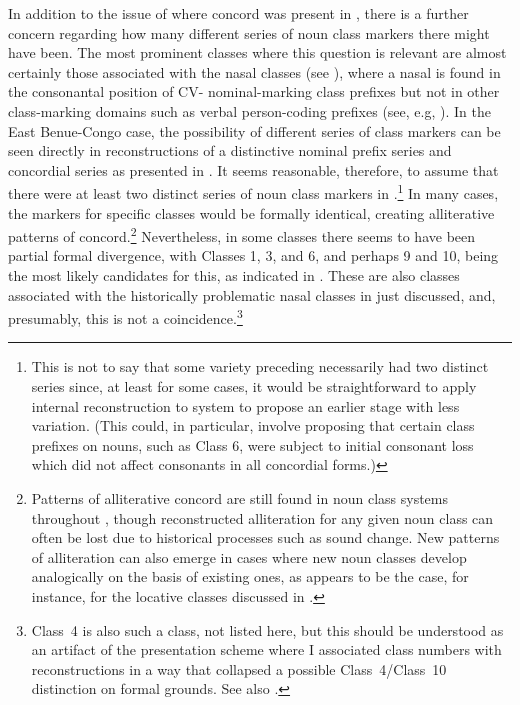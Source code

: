 \documentclass[output=paper ,collection	  ,collectionchapter ,biblatexbackend=biber   ]{langscibook}
\begin{document}
In addition to the issue of where concord was present in ,
there is a further concern regarding how many different series of noun class
markers there might have been. The most prominent classes where this question is
relevant are almost certainly those associated with the  nasal classes (see
), where a nasal is found in the consonantal position of CV-
nominal-marking class prefixes but not in other class-marking domains such as
verbal person-coding prefixes (see, e.g, ). In
the {East Benue-Con\-go} case, the possibility of different series of class
markers can be seen directly in  reconstructions of a
distinctive nominal prefix series and concordial series as presented in
. It seems reasonable, therefore, to assume that there were at
least two distinct series of noun class markers in
.\footnote{This 
  is not to say that some variety preceding
   necessarily had two distinct series since, at least for some
  cases, it would be straightforward to apply internal reconstruction to
    system to propose an earlier stage
  with less variation. (This could, in particular, involve proposing that certain
  class prefixes on nouns, such as Class 6, were subject to initial consonant loss
  which did not affect consonants in all concordial forms.)
  } In many cases, the
markers for specific classes would be formally identical, creating alliterative
patterns of concord.{\footnote{Patterns of alliterative concord are still found
in noun class systems throughout , though reconstructed
alliteration for any given noun class can often be lost due to historical
processes such as sound change. New patterns of alliteration can also emerge in
cases where new noun classes develop analogically on the basis of existing ones,
as appears to be the case, for instance, for the  locative classes
discussed in .}} Nevertheless, in some classes there seems to have
been partial formal divergence, with Classes 1, 3, and 6, and perhaps 9 and 10,
being the most likely candidates for this, as indicated in .
These are also classes associated with the historically problematic nasal
classes in  just discussed, and, presumably, this is not a
coincidence.{\footnote{Class~4 is also such a class, not listed here, but this
should be understood as an artifact of the presentation scheme where I
associated  class numbers with  reconstructions in a
way that collapsed a possible Class~4/Class~10 distinction on formal grounds.
See also .}}
\end{document}
